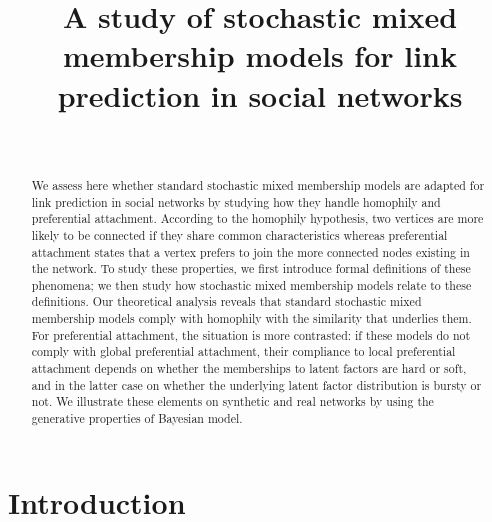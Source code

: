 \documentclass[conference]{IEEEtran}
\begin{document}
\title{A study of stochastic mixed membership models for link prediction in social networks}

\author{\\
}

\maketitle

\begin{abstract}
We assess here whether standard stochastic mixed membership models are adapted for link prediction in social networks by studying how they handle homophily and preferential attachment. According to the homophily hypothesis, two vertices are more likely to be connected if they share common characteristics whereas preferential attachment states that a vertex prefers to join the more connected nodes existing in the network. To study these properties, we first introduce formal definitions of these phenomena; we then study how stochastic mixed membership models relate to these definitions. Our theoretical analysis reveals that standard stochastic mixed membership models comply with homophily with the similarity that underlies them. For preferential attachment, the situation is more contrasted: if these models do not comply with global preferential attachment, their compliance to local preferential attachment depends on whether the memberships to latent factors are hard or soft, and in the latter case on whether the underlying latent factor distribution is bursty or not. We illustrate these elements on synthetic and real networks by using the generative properties of Bayesian model.
\end{abstract}

\IEEEpeerreviewmaketitle

\section{Introduction}
\label{sec:intro}
\end{document}
